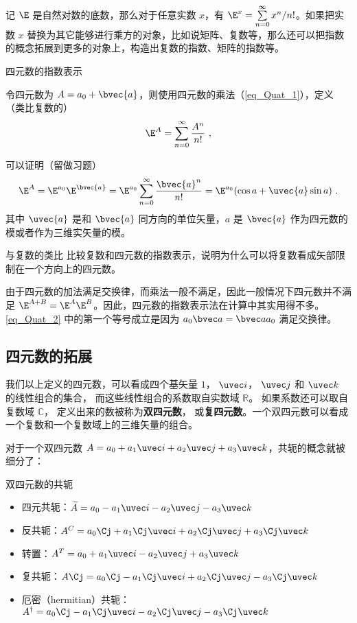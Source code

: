 记 $\E$ 是自然对数的底数，那么对于任意实数 $x$，有 $\E^x = \sum^\infty\limits_{n=0} x^n / n!$。如果把实数 $x$ 替换为其它能够进行乘方的对象，比如说矩阵、复数等，那么还可以把指数的概念拓展到更多的对象上，构造出复数的指数、矩阵的指数等。

\begin{definition}{四元数的指数表示}

令四元数为 $A=a_0+\bvec{a}$，则使用四元数的乘法（\autoref{eq_Quat_1}），定义（类比复数的）
\begin{equation}\label{eq_Quat_2}
\E^A = \sum^\infty\limits_{n=0}\frac{A^n}{n!}~,
\end{equation}
\end{definition}
可以证明（留做习题）
\begin{equation}
\E^A = \E^{a_0}\E^{\bvec{a}}=\E^{a_0}\sum^\infty\limits_{n=0}\frac{\bvec{a}^n}{n!}=\E^{a_0}(\cos{a}+ \uvec{a}\sin a)~.
\end{equation}
其中 $\uvec{a}$ 是和 $\bvec{a}$ 同方向的单位矢量，$a$ 是 $\bvec{a}$ 作为四元数的模或者作为三维实矢量的模。

\begin{exercise}{与复数的类比}
比较复数和四元数的指数表示，说明为什么可以将复数看成矢部限制在一个方向上的四元数。
\end{exercise}

由于四元数的加法满足交换律，而乘法一般不满足，因此一般情况下四元数并不满足 $\E^{A+B} = \E^A \E^B$。因此，四元数的指数表示法在计算中其实用得不多。 \autoref{eq_Quat_2} 中的第一个等号成立是因为 $a_0\bvec a = \bvec a a_0$ 满足交换律。

\subsection{四元数的拓展}

我们以上定义的四元数，可以看成四个基矢量 $1$， $\uvec i$， $\uvec j$ 和 $\uvec k$ 的线性组合的集合， 而这些线性组合的系数取自实数域 $\mathbb R$。 如果系数还可以取自复数域 $\mathbb C$， 定义出来的数被称为\textbf{双四元数}， 或\textbf{复四元数}。一个双四元数可以看成一个复数和一个复数域上的三维矢量的组合。

对于一个双四元数 $A=a_0+a_1 \uvec i+a_2\uvec j+a_3\uvec k$，共轭的概念就被细分了：

\begin{definition}{双四元数的共轭}
\begin{itemize}
\item 四元共轭：$\widetilde{A}=a_0-a_1\uvec i-a_2\uvec j-a_3\uvec k$
\item 反共轭：$A^C=a_0\Cj + a_1\Cj\uvec i+a_2\Cj\uvec j+a_3\Cj\uvec k$
\item 转置：$A^T=a_0+a_1\uvec i-a_2\uvec j+a_3\uvec k$
\item 复共轭：$A\Cj=a_0\Cj-a_1\Cj\uvec i+a_2\Cj\uvec j-a_3\Cj\uvec k$
\item 厄密（hermitian）共轭：$A^\dagger=a_0\Cj-a_1\Cj\uvec i-a_2\Cj\uvec j-a_3\Cj\uvec k$
\end{itemize}
\end{definition}

